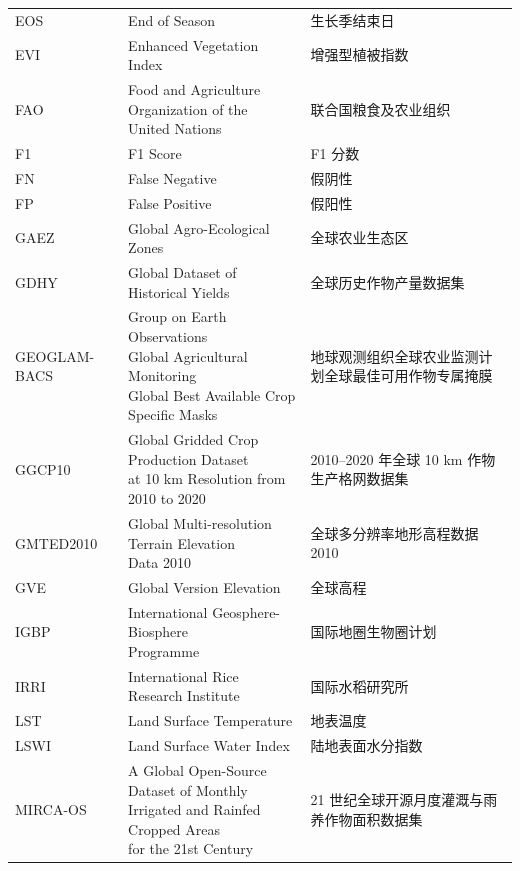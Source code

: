 \begin{center}
\begin{longtable}{@{}m{3cm}m{7.3cm}m{4.8cm}@{}}
        EOS&End of Season&生长季结束日\\
        EVI&Enhanced Vegetation Index&增强型植被指数\\
        FAO&\makecell[l]{Food and Agriculture Organization of the \\United Nations}&联合国粮食及农业组织\\
        F1&F1 Score&F1 分数\\
        FN&False Negative&假阴性\\
        FP&False Positive&假阳性\\
        GAEZ&Global Agro-Ecological Zones&全球农业生态区\\
        GDHY&Global Dataset of Historical Yields&全球历史作物产量数据集\\
        GEOGLAM\newline -BACS&\makecell[l]{Group on Earth Observations\\Global Agricultural Monitoring\\Global Best Available Crop\\Specific Masks}&地球观测组织全球农业监测计划全球最佳可用作物专属掩膜\\
        GGCP10&\makecell[l]{Global Gridded Crop Production Dataset\\at 10 km Resolution from 2010 to 2020}&2010--2020 年全球 10 km 作物生产格网数据集\\
        GMTED2010&\makecell[l]{Global Multi-resolution Terrain Elevation \\Data 2010}&全球多分辨率地形高程数据 2010\\
        GVE&Global Version Elevation&全球高程\\
        IGBP&\makecell[l]{International Geosphere-Biosphere \\Programme}&国际地圈生物圈计划\\
        IRRI&International Rice Research Institute&国际水稻研究所\\
        LST&Land Surface Temperature&地表温度\\
        LSWI&Land Surface Water Index&陆地表面水分指数\\
        MIRCA-OS&\makecell[l]{A Global Open-Source Dataset of Monthly\\Irrigated and Rainfed Cropped Areas\\for the 21st Century}&21 世纪全球开源月度灌溉与雨养作物面积数据集\\

\end{longtable}
\end{center}
